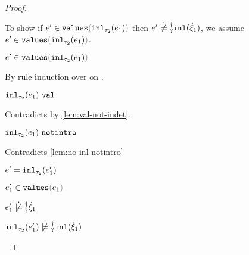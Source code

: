 \begin{proof}
\begin{byCases}
\begin{byCases}
\begin{byCases}
\begin{byCases}
            To show if $\inValues{e'}{\hinl{\tau_2}{e_1}}$ then $\cnotsatisfyormay{e'}{\cinl{\hxi_1}}$, we assume $\inValues{e'}{\hinl{\tau_2}{e_1}}$.
            \begin{pfsteps*}
            \item $\inValues{e'}{\hinl{\tau_2}{e_1}}$  
            \end{pfsteps*}
            By rule induction over  on .
            \begin{byCases}
              \item[\text{(\ref{rule:IVVal})}]
              \begin{pfsteps*}
              \item $\mathtt{inl}_{\tau_2}({e_1}) ~\mathtt{val}$ 
              \end{pfsteps*} 
              Contradicts  by \autoref{lem:val-not-indet}.
              \item[\text{(\ref{rule:IVIndet})}] 
              \begin{pfsteps*}
              \item $\mathtt{inl}_{\tau_2}({e_1}) ~\mathtt{notintro}$ 
              \end{pfsteps*} 
              Contradicts \autoref{lem:no-inl-notintro}
              \item[\text{(\ref{rule:IVInl})}] 
              \begin{pfsteps*}
              \item $e'=\mathtt{inl}_{\tau_2}({e_1'})$ 
              \item $\inValues{e_1'}{e_1}$  
              \item $\cnotsatisfyormay{e_1'}{\hxi_1}$  
              \item $\cnotsatisfyormay{\hinl{\tau_2}{e_1'}}{\cinl{\hxi_1}}$ 
              \end{pfsteps*} 
            \end{byCases}
          \end{byCases}
          \item[\text{(\ref{rule:IInr})}] 
          \begin{pfsteps*}

\end{pfsteps*}
\end{byCases}
\end{byCases}
\end{byCases}
\end{proof}
